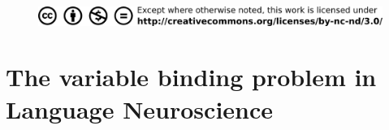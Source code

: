 \documentclass[twoside, justified, notoc, nobib, 
	nohyper]{tufte-book}
\begin{document}
\begin{fullwidth}
\begin{figure}[b]
\begin{center}
\includegraphics{figures/title/creativecommons}
\end{center}
\end{figure}


\end{fullwidth}%
\clearpage\null\newpage


%

%

%

%

\cleardoublepage

\begin{fullwidth}
\tableofcontents
\end{fullwidth}

\begin{fullwidth}
\listoffigures
\end{fullwidth}

\begin{fullwidth}
\listoftables
\end{fullwidth}

%
%
\clearpage\null\newpage

\setcounter{page}{1}
%
\cleardoublepage


\part{The variable binding problem in Language Neuroscience}
\cleardoublepage
%
\FloatBarrier
%
\FloatBarrier
%
\FloatBarrier
\end{document}
